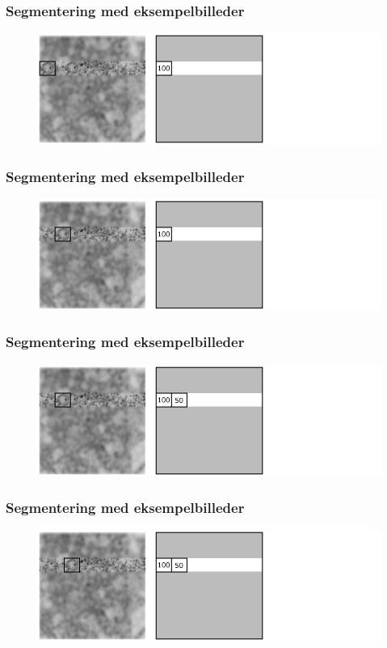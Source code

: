 \documentclass[12pt,t]{beamer}
\begin{document}
\begin{frame}
\frametitle{Segmentering med eksempelbilleder}
\begin{figure}[H]
\includegraphics[scale=0.35]{img/afstand/10.png}
\end{figure}
\end{frame}

\begin{frame}
\frametitle{Segmentering med eksempelbilleder}
\begin{figure}[H]
\includegraphics[scale=0.35]{img/afstand/11.png}
\end{figure}
\end{frame}

\begin{frame}
\frametitle{Segmentering med eksempelbilleder}
\begin{figure}[H]
\includegraphics[scale=0.35]{img/afstand/12.png}
\end{figure}
\end{frame}

\begin{frame}
\frametitle{Segmentering med eksempelbilleder}
\begin{figure}[H]
\includegraphics[scale=0.35]{img/afstand/13.png}
\end{figure}
\end{frame}
\end{document}

